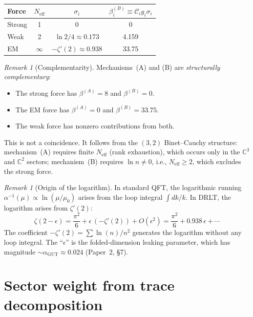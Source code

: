 \documentclass[12pt]{article}
\theoremstyle{definition}
\theoremstyle{remark}
\newtheorem{remark}[theorem]{Remark}
\newcommand{\CC}{\mathbb{C}}
\newcommand{\agut}{\alpha_{\mathrm{GUT}}}
\newcommand{\Neff}{N_{\mathrm{eff}}}
\begin{document}
\begin{center}
\begin{tabular}{lccc}
\toprule
Force & $\Neff$ & $\sigma_i$ &
  $\beta^{(B)}_i \equiv \mathcal{C}_i g_i \sigma_i$ \\
\midrule
Strong & 1 & 0 & 0 \\
Weak & 2 & $\ln 2 / 4 \approx 0.173$ & 4.159 \\
EM & $\infty$ & $-\zeta'(2) \approx 0.938$ & 33.75 \\
\bottomrule
\end{tabular}
\end{center}

\begin{remark}[Complementarity]
\label{rem:complementarity}
Mechanisms~(A) and (B) are \emph{structurally complementary}:
\begin{itemize}
\item The strong force has $\beta^{(A)} = 8$
  and $\beta^{(B)} = 0$.
\item The EM force has $\beta^{(A)} = 0$
  and $\beta^{(B)} = 33.75$.
\item The weak force has nonzero contributions
  from both.
\end{itemize}
This is not a coincidence.
It follows from the $(3,2)$ Binet--Cauchy structure:
mechanism~(A) requires finite $\Neff$ (rank exhaustion),
which occurs only in the $\CC^3$ and $\CC^2$ sectors;
mechanism~(B) requires $\ln n \neq 0$, i.e., $\Neff \geq 2$,
which excludes the strong force.
\end{remark}

\begin{remark}[Origin of the logarithm]
\label{rem:log}
In standard QFT, the logarithmic running
$\alpha^{-1}(\mu) \propto \ln(\mu/\mu_0)$ arises from
the loop integral $\int dk/k$.
In DRLT, the logarithm arises from $\zeta'(2)$:
\begin{equation}
  \zeta(2 - \epsilon)
  = \frac{\pi^2}{6} + \epsilon\,(-\zeta'(2)) + O(\epsilon^2)
  = \frac{\pi^2}{6} + 0.938\,\epsilon + \cdots
  \label{eq:log_origin}
\end{equation}
The coefficient $-\zeta'(2) = \sum \ln(n)/n^2$ generates
the logarithm without any loop integral.
The ``$\epsilon$'' is the folded-dimension leaking parameter,
which has magnitude $\sim \agut \approx 0.024$ (Paper~2, \S7).
\end{remark}

\section{Sector weight from trace decomposition}
\label{sec:weight}
\end{document}
